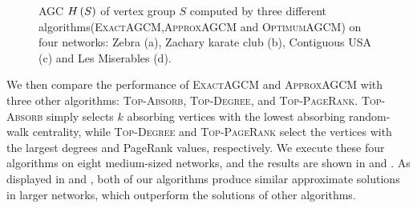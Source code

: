 \documentclass[journal]{IEEEtran}
\begin{document}
\begin{figure}
    \caption{AGC \(H\left(S\right)\) of vertex group \(S\) computed by three different algorithms(\textsc{ExactAGCM},\textsc{ApproxAGCM} and \textsc{OptimumAGCM}) on four networks: Zebra (a), Zachary karate club (b), Contiguous USA (c) and Les Miserables (d).\label{pic:compare-effect-optimum}}
\end{figure}

We then compare the performance of \textsc{ExactAGCM} and \textsc{ApproxAGCM} with three other algorithms: \textsc{Top-Absorb}, \textsc{Top-Degree}, and \textsc{Top-PageRank}.
\textsc{Top-Absorb} simply selects \(k\) absorbing vertices with the lowest absorbing random-walk centrality, while \textsc{Top-Degree} and \textsc{Top-PageRank} select the vertices with the largest degrees and PageRank values, respectively.
We execute these four algorithms on eight medium-sized networks, and the results are shown in  and .
As displayed in  and , both of our algorithms produce similar approximate solutions in larger networks, which outperform the solutions of other algorithms.
\end{document}
